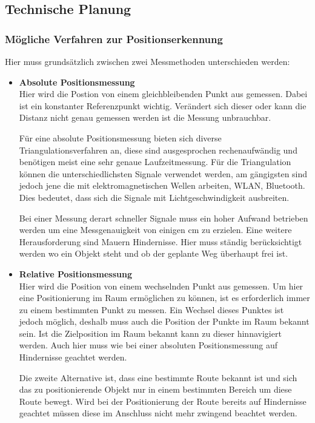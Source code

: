   \subsection{Technische Planung}
    \subsubsection{Mögliche Verfahren zur Positionserkennung}
    Hier muss grundsätzlich zwischen zwei Messmethoden unterschieden werden:
    \begin{itemize}
      \item \textbf{Absolute Positionsmessung}\\
      Hier wird die Postion von einem gleichbleibenden Punkt aus gemessen. Dabei ist ein konstanter Referenzpunkt wichtig. Verändert sich dieser oder kann die Distanz nicht genau gemessen werden ist die Messung unbrauchbar.

      Für eine absolute Positionsmessung bieten sich diverse Triangulationsverfahren an, diese sind ausgesprochen rechenaufwändig und benötigen meist eine sehr genaue Laufzeitmessung. Für die Triangulation können die unterschiedlichsten Signale verwendet werden, am gängigsten sind jedoch jene die mit elektromagnetischen Wellen arbeiten, \zB WLAN, Bluetooth. Dies bedeutet, dass sich die Signale mit Lichtgeschwindigkeit ausbreiten.

      Bei einer Messung derart schneller Signale muss ein hoher Aufwand betrieben werden um eine Messgenauigkeit von einigen cm zu erzielen. Eine weitere Herausforderung sind Mauern \bzw Hindernisse. Hier muss ständig berücksichtigt werden wo ein Objekt steht und ob der geplante Weg überhaupt frei ist.
      \item \textbf{Relative Positionsmessung}\\
      Hier wird die Position von einem wechselnden Punkt aus gemessen. Um hier eine Positionierung im Raum ermöglichen zu können, ist es erforderlich immer zu einem bestimmten Punkt zu messen. Ein Wechsel dieses Punktes ist jedoch möglich, deshalb muss auch die Position der Punkte im Raum bekannt sein. Ist die Zielposition im Raum bekannt kann zu dieser hinnavigiert werden. Auch hier muss wie bei einer absoluten Positionsmessung auf Hindernisse geachtet werden.

      Die zweite Alternative ist, dass eine bestimmte Route bekannt ist und sich das zu positionierende Objekt nur in einem bestimmten Bereich um diese Route bewegt. Wird bei der Positionierung der Route bereits auf Hindernisse geachtet müssen diese im Anschluss nicht mehr zwingend beachtet werden.
    \end{itemize}

